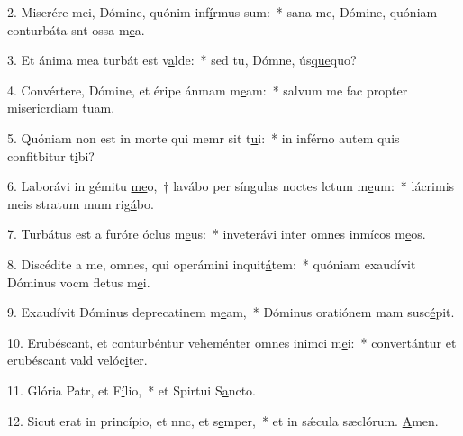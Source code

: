 2. Miserére mei, Dómine, quónim inf\uline{í}rmus sum:~* sana me, Dómine, quóniam conturbáta snt ossa m\uline{e}a.\par 
3. Et ánima mea turbát est v\uline{a}lde:~* sed tu, Dómne, ús\uline{que}quo?\par 
4. Convértere, Dómine, et éripe ánmam m\uline{e}am:~* salvum me fac propter misericrdiam t\uline{u}am.\par 
5. Quóniam non est in morte qui memr sit t\uline{u}i:~* in inférno autem quis confitbitur t\uline{i}bi?\par 
6. Laborávi in gémitu \uline{me}o,~† lavábo per síngulas noctes lctum m\uline{e}um:~* lácrimis meis stratum mum rig\uline{á}bo.\par 
7. Turbátus est a furóre óclus m\uline{e}us:~* inveterávi inter omnes inmícos m\uline{e}os.\par 
8. Discédite a me, omnes, qui operámini inquit\uline{á}tem:~* quóniam exaudívit Dóminus vocm fletus m\uline{e}i.\par 
9. Exaudívit Dóminus deprecatinem m\uline{e}am,~* Dóminus oratiónem mam susc\uline{é}pit.\par 
10. Erubéscant, et conturbéntur veheménter omnes inimci m\uline{e}i:~* convertántur et erubéscant vald velóc\uline{i}ter.\par 
11. Glória Patr, et F\uline{í}lio,~* et Spirtui S\uline{a}ncto.\par 
12. Sicut erat in princípio, et nnc, et s\uline{e}mper,~* et in sǽcula sæclórum. \uline{A}men.\par 
